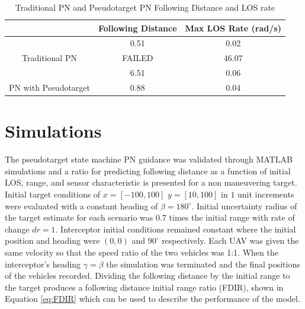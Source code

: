 \documentclass[conference]{IEEEtran}
\begin{document}
\begin{table}[H]
	\centering
	\caption{Traditional PN and Pseudotarget PN Following Distance and LOS rate}
	\label{my-label}
	\begin{tabular}{c|c|c|}
		\cline{2-3}
		\multicolumn{1}{l|}{}                                        & \multicolumn{1}{l|}{Following Distance} & \multicolumn{1}{l|}{Max LOS Rate (rad/s)} \\ \hline
		\multicolumn{1}{|c|}{}                                       & 0.51                                    & 0.02                                      \\ \cline{2-3} 
		\multicolumn{1}{|c|}{\multirow{-2}{*}{Traditional PN}}       & \cellcolor[HTML]{C0C0C0} FAILED         & 46.07                                     \\ \hline
		\multicolumn{1}{|c|}{}                                       & 6.51                                    & 0.06                                      \\ \cline{2-3} 
		\multicolumn{1}{|c|}{\multirow{-2}{*}{PN with Pseudotarget}} & 0.88                                    & 0.04                                      \\ \hline
	\end{tabular}
\end{table}

\section{Simulations}
The pseudotarget state machine PN guidance was validated through MATLAB simulations and a ratio for predicting following distance as a function of initial LOS, range, and sensor characteristic is presented for a non maneuvering target. Initial target conditions of $x = [-100,100]$ $y = [10,100]$ in $1$ unit increments were evaluated with a constant heading of $\beta = 180^{\circ}$. Initial uncertainty radius of the target estimate for each scenario was $0.7$ times the initial range with rate of change $dr = 1$. Interceptor initial conditions remained constant where the initial position and heading were $(0,0)$ and $90^{\circ}$ respectively. Each UAV was given the same velocity so that the speed ratio of the two vehicles was 1:1. When the interceptor's heading $\gamma = \beta$ the simulation was terminated and the final positions of the vehicles recorded. Dividing the following distance by the initial range to the target produces a following distance initial range ratio (FDIR), shown in Equation \ref{eq:FDIR} which can be used to describe the performance of the model.
\end{document}
